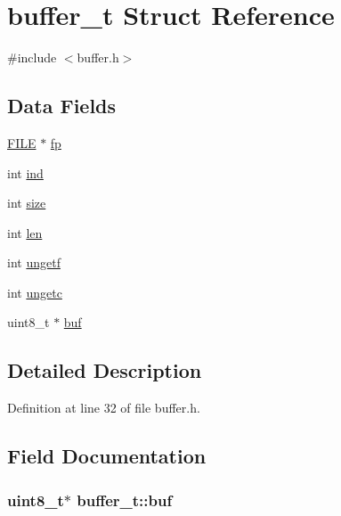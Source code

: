\hypertarget{structbuffer__t}{}\section{buffer\+\_\+t Struct Reference}
\label{structbuffer__t}


{\ttfamily \#include $<$buffer.\+h$>$}

\subsection*{Data Fields}
\begin{DoxyCompactItemize}
\item 
\hyperlink{posix_8h_aed4dabeb9f7c518ded42f930a04abce8}{F\+I\+LE} $\ast$ \hyperlink{structbuffer__t_a00a55014e0827223c41b1b1d56e5be5d}{fp}
\item 
int \hyperlink{structbuffer__t_a59ea992e5006ead050862bae5c41670a}{ind}
\item 
int \hyperlink{structbuffer__t_a34e81d898c6accf4f06ed9c1133d6361}{size}
\item 
int \hyperlink{structbuffer__t_a0b67fc6880d331ae05dab0e58a4584c2}{len}
\item 
int \hyperlink{structbuffer__t_a67c2edddeca1858c670ff57e049a9e0e}{ungetf}
\item 
int \hyperlink{structbuffer__t_aa1fbbf42ce5d6278b21a93647bef3ff1}{ungetc}
\item 
uint8\+\_\+t $\ast$ \hyperlink{structbuffer__t_ab98e4f2d4fe10a680089d291ef1907c7}{buf}
\end{DoxyCompactItemize}


\subsection{Detailed Description}


Definition at line 32 of file buffer.\+h.



\subsection{Field Documentation}
\subsubsection[{\texorpdfstring{buf}{buf}}]{\setlength{\rightskip}{0pt plus 5cm}uint8\+\_\+t$\ast$ buffer\+\_\+t\+::buf}\hypertarget{structbuffer__t_ab98e4f2d4fe10a680089d291ef1907c7}{}\label{structbuffer__t_ab98e4f2d4fe10a680089d291ef1907c7}


